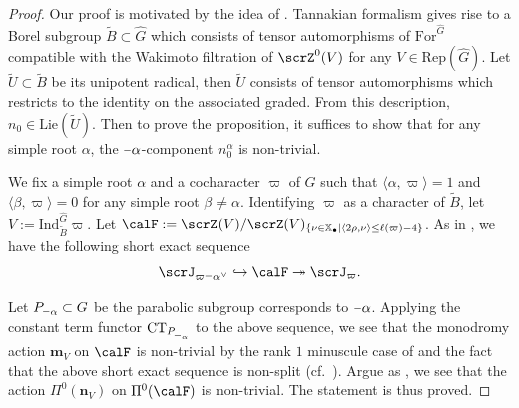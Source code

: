 \documentclass[10pt, reqno]{amsart}
\theoremstyle{plain}
\theoremstyle{definition}
\newcommand{\minus}{\scalebox{0.75}[1.0]{$-$}}
\numberwithin{equation}{section}
\begin{document}
\begin{proof}
	Our proof is motivated by the idea of \cite{bezrukavnikov2020modular}. Tannakian formalism gives rise to a Borel subgroup $\tilde{B}\subset\hat{G}$ which consists of tensor automorphisms of $\mathrm{For}^{\hat{G}}$ compatible with the Wakimoto filtration of $\scrZ^0(V)$ for any $V\in\mathrm{Rep} (\hat{G})$. Let $\tilde{U}\subset \tilde{B}$ be its unipotent radical, then $\tilde{U}$ consists of tensor automorphisms which restricts to the identity on the associated graded. From this description, $n_0\in \mathrm{Lie}(\tilde{U})$. Then to prove the proposition, it suffices to show that for any simple root $\alpha$, the $\minus\alpha$-component $n_0^\alpha$ is non-trivial.
	
	We fix a simple root $\alpha$ and a cocharacter $\varpi$ of $G$ such that $\langle\alpha,\varpi \rangle=1$ and $\langle \beta,\varpi\rangle=0$ for any simple root $\beta\neq \alpha$. Identifying $\varpi$ as a character of $\tilde{B}$, let $V:=\mathrm{Ind}_{\tilde{B}}^{\hat{G}}\varpi$. Let $\calF:=\scrZ(V)/\scrZ(V)_{\{\nu\in\mathbb{X}_\bullet\vert \langle 2\rho,\nu\rangle\leq \ell(\varpi)-4\}}$. As in \cite[Section6.3]{bezrukavnikov2020modular}, we have the following short exact sequence
	\begin{equation}
		\scrJ_{\varpi\minus\alpha^\vee}\hookrightarrow \calF\twoheadrightarrow \scrJ_{\varpi}.
	\end{equation}
	
	Let $P_{\minus\alpha}\subset G$ be the parabolic subgroup corresponds to $\minus\alpha$. Applying the constant term functor $\mathrm{CT}_{P_{\minus \alpha}}$ to the above sequence, we see that the monodromy action $\mathbf{m}_V$ on $\calF$ is non-trivial by the rank $1$ minuscule case of  and the fact that the above short exact sequence is non-split (cf.\ \cite[Lemma 6.6]{bezrukavnikov2020modular}). Argue as \cite[Proposition 6.2]{bezrukavnikov2020modular}, we see that the action $\Pi^0(\mathbf{n}_V)$ on $\Pi^0(\calF)$ is non-trivial. The statement is thus proved. 
\end{proof}
\end{document}
